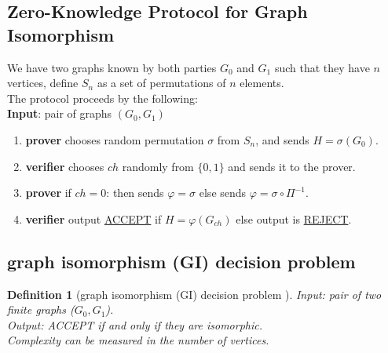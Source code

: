\documentclass[12pt,a4paper]{article}
\newtheorem{defn}[thm]{Definition}
\begin{document}
\subsection{ Zero-Knowledge Protocol for Graph Isomorphism}
We have two graphs known by both parties $G_0$ and $G_1$ such that they have $n$ vertices, define $S_n$ as a set of permutations of $n$ elements.\\   
The protocol proceeds by the following:\cite{lec-notes1:3}\\
\textbf{Input}: pair of graphs $(G_0,G_1)$
\begin{enumerate}	
	\item
	\begin{enumerate}
\textbf{prover} chooses random permutation $\sigma$ from $S_n$, and sends $H=\sigma(G_0)$.
\end{enumerate}
	\item
\begin{enumerate}
\textbf{verifier}  chooses $ch$ randomly from $\{0,1\}$ and sends it to the prover.
\end{enumerate}
	\item
\begin{enumerate}
\textbf{prover} if $ch=0$: then sends $\varphi=\sigma$ else sends $\varphi=\sigma \circ \Pi^{-1}$.
\end{enumerate}
	\item
\begin{enumerate}
\textbf{verifier} output \underline{ACCEPT} if $H=\varphi(G_{ch})$ else output is \underline{REJECT}.\\

\end{enumerate}
\end{enumerate}
\subsection{graph isomorphism (GI) decision problem}
\begin{defn}[graph isomorphism (GI) decision problem \cite{goldreich2007foundations:17}]
\textit{Input}: pair of two finite graphs ($G_0 , G_1$).\\
\textit{Output}: ACCEPT if and only if they are isomorphic.\\
Complexity can be measured in the number of vertices.
\end{defn}
\end{document}
